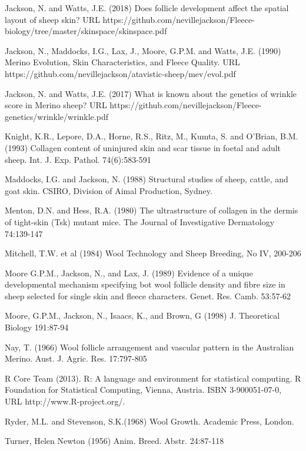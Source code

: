 \documentclass[titlepage]{article}  %
\begin{document}
\begin{thebibliography}{99}
Jackson, N. and Watts, J.E. (2018) Does follicle development affect the spatial layout of sheep skin? URL https://github.com/nevillejackson/Fleece-biology/tree/master/skinspace/skinspace.pdf

Jackson, N., Maddocks, I.G., Lax, J., Moore, G.P.M. and Watts, J.E. (1990) Merino Evolution, Skin Characteristics, and Fleece Quality. URL https://github.com/nevillejackson/atavistic-sheep/mev/evol.pdf 

Jackson, N. and Watts, J.E. (2017) What is known about the genetics of wrinkle score in Merino sheep? URL https://github.com/nevillejackson/Fleece-genetics/wrinkle/wrinkle.pdf

Knight, K.R., Lepore, D.A., Horne, R.S., Ritz, M., Kumta, S. and O'Brian, B.M. (1993) Collagen content of uninjured skin and scar tissue in foetal and adult sheep. Int. J. Exp. Pathol. 74(6):583-591

Maddocks, I.G. and Jackson, N. (1988) Structural studies of sheep, cattle, and goat skin. CSIRO, Division of Aimal Production, Sydney.

Menton, D.N. and Hess, R.A. (1980) The ultrastructure of collagen in the dermis of tight-skin (Tsk) mutant mice. The Journal of Investigative Dermatology 74:139-147

Mitchell, T.W. et al (1984) Wool Technology and Sheep Breeding, No IV, 200-206

Moore G.P.M., Jackson, N., and Lax, J. (1989) Evidence of a unique developmental mechanism specifying bot wool follicle density and fibre size in sheep selected for single skin and fleece characters. Genet. Res. Camb. 53:57-62

Moore, G.P.M., Jackson, N., Isaacs, K., and Brown, G (1998) J. Theoretical Biology 191:87-94

Nay, T. (1966) Wool follicle arrangement and vascular pattern in the Australian Merino. Aust. J. Agric. Res. 17:797-805

R Core Team (2013). R: A language and environment for statistical
  computing. R Foundation for Statistical Computing, Vienna, Austria.
  ISBN 3-900051-07-0, URL http://www.R-project.org/.

Ryder, M.L. and Stevenson, S.K.(1968) Wool Growth. Academic Press, London.


Turner, Helen Newton (1956) Anim. Breed. Abstr. 24:87-118


\end{thebibliography}
\end{document}
